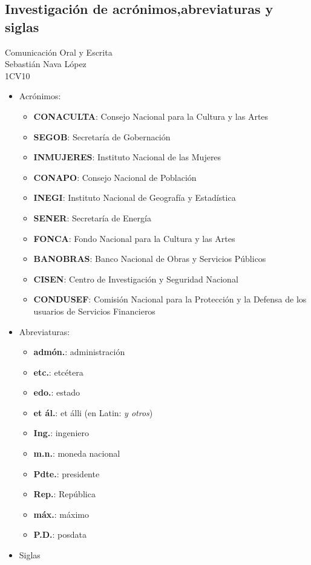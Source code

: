 \documentclass[a4paper,12pt]{article}
\newcommand{\titlehomework}[4]{\begin{center}\section*{#4}{\large #2}\\#1\\#3\\[2ex]\end{center}}
\begin{document}
\titlehomework{Sebastián Nava López}{Comunicación Oral y Escrita}{1CV10}{Investigación de acrónimos,abreviaturas y siglas}
\begin{itemize}
\item Acrónimos:
\begin{itemize}
\item \textbf{CONACULTA}: Consejo Nacional para la Cultura y las Artes
\item \textbf{SEGOB}: Secretaría de Gobernación 
\item \textbf{INMUJERES}: Instituto Nacional de las Mujeres
\item \textbf{CONAPO}: Consejo Nacional de Población
\item \textbf{INEGI}: Instituto Nacional de Geografía y Estadística
\item \textbf{SENER}: Secretaría de Energía
\item \textbf{FONCA}: Fondo Nacional para la Cultura y las Artes
\item \textbf{BANOBRAS}: Banco Nacional de Obras y Servicios Públicos
\item \textbf{CISEN}: Centro de Investigación y Seguridad Nacional
\item \textbf{CONDUSEF}: Comisión Nacional para la Protección y la Defensa de los usuarios de Servicios Financieros  
\end{itemize}
\item Abreviaturas:
\begin{multicols}{3}
\begin{itemize}
\item \textbf{admón.}:\hspace{3em} administración
\item \textbf{etc.}: etcétera
\item \textbf{edo.}: estado
\item \textbf{et ál.}: et álli (en Latin: \textit{y otros})
\item \textbf{Ing.}: ingeniero
\item \textbf{m.n.}: moneda nacional
\item \textbf{Pdte.}: presidente
\item \textbf{Rep.}: República
\item \textbf{máx.}: máximo         
\item \textbf{P.D.}: posdata 
\end{itemize}
\end{multicols}
\item Siglas
\begin{itemize}

\end{itemize}
\end{itemize}
\end{document}
